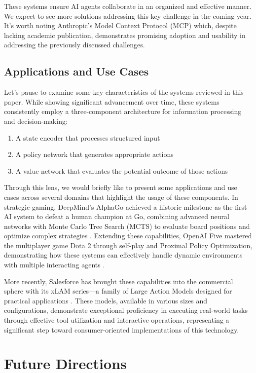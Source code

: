 \documentclass[journal,twoside,10pt]{IEEEtran}
\begin{document}
These systems ensure AI agents collaborate in an organized and effective manner. We expect to see more solutions addressing this key challenge in the coming year. It's worth noting Anthropic's Model Context Protocol (MCP) which, despite lacking academic publication, demonstrates promising adoption and usability in addressing the previously discussed challenges.
\subsection{Applications and Use Cases}
Let's pause to examine some key characteristics of the systems reviewed in this paper. While showing significant advancement over time, these systems consistently employ a three-component architecture for information processing and decision-making:

\begin{enumerate}
    \item A state encoder that processes structured input
    \item A policy network that generates appropriate actions
    \item A value network that evaluates the potential outcome of those actions
\end{enumerate}

Through this lens, we would briefly like to present some applications and use cases across several domains that highlight the usage of these components.
In strategic gaming, DeepMind's AlphaGo achieved a historic milestone as the first AI system to defeat a human champion at Go, combining advanced neural networks with Monte Carlo Tree Search (MCTS) to evaluate board positions and optimize complex strategies \cite{silver2016mastering}. Extending these capabilities, OpenAI Five mastered the multiplayer game Dota 2 through self-play and Proximal Policy Optimization, demonstrating how these systems can effectively handle dynamic environments with multiple interacting agents \cite{openai2019dota}.

More recently, Salesforce has brought these capabilities into the commercial sphere with its xLAM series—a family of Large Action Models designed for practical applications \cite{zhang2024xlam}. These models, available in various sizes and configurations, demonstrate exceptional proficiency in executing real-world tasks through effective tool utilization and interactive operations, representing a significant step toward consumer-oriented implementations of this technology.
\section{Future Directions} 
\end{document}
